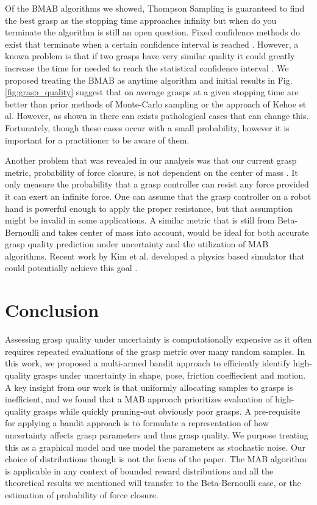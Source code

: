 \documentclass[journal,transmag]{IEEEtran}%
\begin{document}
Of the BMAB algorithms we showed, Thompson Sampling is guaranteed to find the best grasp as the stopping time approaches infinity \cite{agrawal2011analysis} but when do you terminate the algorithm is still an open question. Fixed confidence methods do exist that terminate when a certain confidence interval is reached \cite{maron1993hoeffding} \cite{mnih2008empirical}. However, a known problem is that if two grasps have very similar quality it could greatly increase the time for needed to reach the statistical confidence interval \cite{audibert2010best}. We proposed treating the BMAB as anytime algorithm and initial results in Fig. \ref{fig:grasp_quality} suggest that on average grasps at a given stopping time are better than prior methods of Monte-Carlo sampling or the approach of Kehoe et al. However, as shown in  there can exists pathological cases that can change this. Fortunately, though these cases occur with a small probability, however it is important for a practitioner to be aware of them. 


Another problem that was revealed in our analysis was that our current grasp metric, probability of force closure, is not dependent on the center of mass \cite{ferrari1992}. It only measure the probability that a grasp controller can resist any force provided it can exert an infinite force.  One can assume that the grasp controller on a robot hand is powerful enough to apply the proper resistance, but that assumption might be invalid in some applications. A similar metric that is still from Beta-Bernoulli and takes center of mass into account, would be ideal for both accurate grasp quality prediction under uncertainty and the utilization of MAB algorithms.  Recent work by Kim et al. developed a physics based simulator that could potentially achieve this goal \cite{kim2012physically}. 

\section{Conclusion}
Assessing grasp quality under  uncertainty is computationally expensive as it often requires repeated evaluations of the grasp metric over many random samples.
In this work, we proposed a multi-armed bandit approach to efficiently identify high-quality grasps under uncertainty in shape, pose, friction coeffiecient and motion. 
A key insight from our work is that uniformly allocating samples to grasps is inefficient, and
 we found that a MAB approach prioritizes evaluation of high-quality grasps while quickly pruning-out obviously poor grasps.
A pre-requisite for applying a bandit approach is to formulate a representation  of how uncertainty affects grasp parameters and thus grasp quality.
We purpose treating this as a graphical model and use model the parameters as stochastic noise. Our choice of distributions though is not the focus of the paper. The MAB algorithm is applicable in any context of bounded reward distributions and all the theoretical results we mentioned will transfer to the Beta-Bernoulli case, or the estimation of probability of force closure. 
\end{document}
